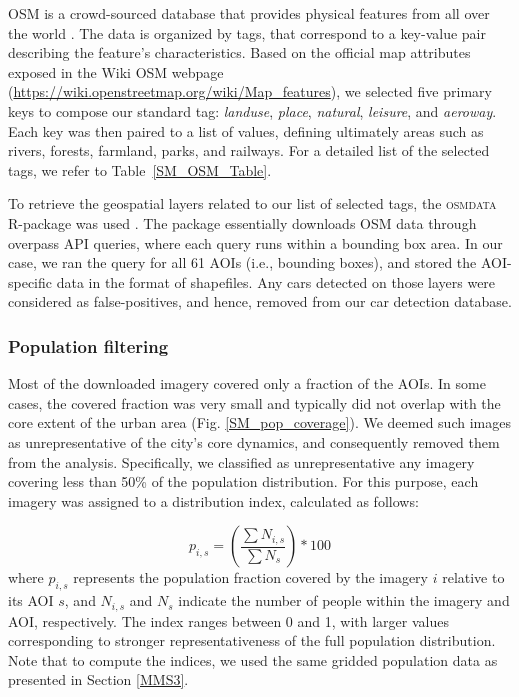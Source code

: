 \documentclass[sn-basic]{sn-jnl}%
\begin{document}
OSM is a crowd-sourced database that provides physical features from all over the world \citep{Mooney_and_Minghini_2017}. The data is organized by tags, that correspond to a key-value pair describing the feature's characteristics. Based on the official map attributes exposed in the Wiki OSM webpage (\url{https://wiki.openstreetmap.org/wiki/Map_features}), we selected five primary keys to compose our standard tag: \textit{landuse}, \textit{place}, \textit{natural}, \textit{leisure}, and \textit{aeroway}. Each key was then paired to a list of values, defining ultimately areas such as rivers, forests, farmland, parks, and railways. For a detailed list of the selected tags, we refer to Table~\ref{SM_OSM_Table}.


To retrieve the geospatial layers related to our list of selected tags, the \textsc{osmdata} R-package was used \citep{Padgham_et_al_2017}. The package essentially downloads OSM data through overpass API queries, where each query runs within a bounding box area. In our case, we ran the query for all 61 AOIs (i.e., bounding boxes), and stored the AOI-specific data in the format of shapefiles. Any cars detected on those layers were considered as false-positives, and hence, removed from our car detection database. 

\subsubsection{Population filtering} \label{MMS4-2}
Most of the downloaded imagery covered only a fraction of the AOIs. In some cases, the covered fraction was very small and typically did not overlap with the core extent of the urban area (Fig. \ref{SM_pop_coverage}). We deemed such images as unrepresentative of the city's core dynamics, and consequently removed them from the analysis. Specifically, we classified as unrepresentative any imagery covering less than 50\% of the population distribution. For this purpose, each imagery was assigned to a distribution index, calculated as follows:

\begin{equation}
p_{i,s} = (\frac{\sum N_{i,s}} {\sum N_{s}})*100
\end{equation}
where $p_{i,s}$ represents the population fraction covered by the imagery $i$ relative to its AOI $s$, and $N_{i,s}$ and $N_{s}$ indicate the number of people within the imagery and AOI, respectively. The index ranges between 0 and 1, with larger values corresponding to stronger representativeness of the full population distribution. Note that to compute the indices, we used the same gridded population data as presented in Section \ref{MMS3}. 
\end{document}
